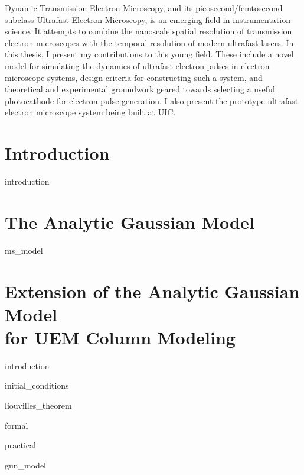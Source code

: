 \documentclass{uicthesi}
\begin{document}
 
 
\tableofcontents
\listoffigures
 

 
\summary
Dynamic Transmission Electron Microscopy, and its picosecond/femtosecond subclass Ultrafast Electron Microscopy, is an emerging field in instrumentation science.
It attempts to combine the nanoscale spatial resolution of transmission electron microscopes with the temporal resolution of modern ultrafast lasers.
In this thesis, I present my contributions to this young field. 
These include a novel model for simulating the dynamics of ultrafast electron pulses in electron microscope systems,
design criteria for constructing such a system, and theoretical and experimental groundwork geared towards selecting a useful photocathode for electron pulse generation.
I also present the prototype ultrafast electron microscope system being built at UIC.

\chapter{Introduction}

  {introduction}

\chapter{The Analytic Gaussian Model} \label{chap:ms_model}

  {ms_model}

\chapter{Extension of the Analytic Gaussian Model\\for UEM Column Modeling} \label{chap:extension}

  {introduction}

  {initial_conditions}

  {liouvilles_theorem}

  {formal}

  {practical}

  {gun_model}
\end{document}
